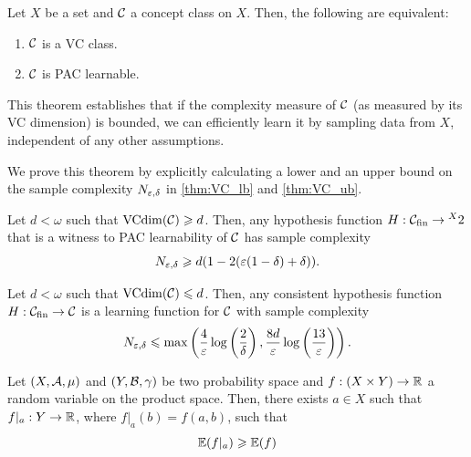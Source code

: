 \begin{theorem}
    \label{thm:fundamentalThmPacLearning}
    Let $X$ be a set and $\mathcal{C}$ a concept class on $X$. Then, the following are equivalent:
    \begin{enumerate}
        \item $\mathcal{C}$ is a VC class.
        \item $\mathcal{C}$ is PAC learnable.
    \end{enumerate}
\end{theorem}

This theorem establishes that if the complexity measure of $\mathcal{C}$ (as measured by its VC dimension) is bounded, we can efficiently learn it by sampling data from $X$, independent of any other assumptions.

We prove this theorem by explicitly calculating a lower and an upper bound on the sample complexity $N_{\varepsilon,\delta}$ in \cref{thm:VC_lb} and \cref{thm:VC_ub}. 

\begin{theorem}
    \label{thm:VC_lb}
    Let $d < \omega$ such that $\operatorname{VCdim}(\mathcal{C}) \geqslant d$. Then, any hypothesis function $H:\mathcal{C}_{\text{fin}}\rightarrow\prescript{X}{}{2}$ that is a witness to PAC learnability of $\mathcal{C}$ has sample complexity
    $$N_{\varepsilon,\delta} \geqslant
    d(1-2(\varepsilon(1-\delta)+\delta)).$$
\end{theorem}

\begin{theorem}
    \label{thm:VC_ub}
    Let $d < \omega$ such that $\operatorname{VCdim}(\mathcal{C}) \leqslant d$. Then, any consistent hypothesis function $H:\mathcal{C}_{\text{fin}}\rightarrow\mathcal{C}$ is a learning function for $\mathcal{C}$ with sample complexity
    $$N_{\varepsilon,\delta} \leqslant \max 
    \left(
    \frac{4}{\varepsilon} \log \left( \frac{2}{\delta} \right), 
    \frac{8d}{\varepsilon} \log \left( \frac{13}{\varepsilon} \right)
    \right).$$
\end{theorem}

\begin{fact}
    \label{fact:expValue}
    Let $(X,\mathcal{A}, \mu)$ and $(Y, \mathcal{B}, \gamma)$ be two probability space and $f:(X\times Y)\rightarrow \mathbb{R}$ a random variable on the product space. Then, there exists $a\in X$ such that $f|_a:Y\rightarrow \mathbb{R}$, where $f|_a(b)=f(a,b)$, such that 
    $$\operatorname{\mathbb{E}}(f|_a)\geqslant \operatorname{\mathbb{E}}(f)$$
\end{fact}

